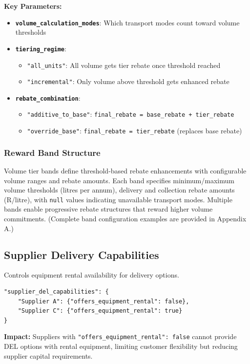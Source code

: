 \textbf{Key Parameters:}
\begin{itemize}
    \item \textbf{\texttt{volume\_calculation\_modes}}: Which transport modes count toward volume thresholds
    \item \textbf{\texttt{tiering\_regime}}: 
    \begin{itemize}
        \item \texttt{"all\_units"}: All volume gets tier rebate once threshold reached
        \item \texttt{"incremental"}: Only volume above threshold gets enhanced rebate
    \end{itemize}
    \item \textbf{\texttt{rebate\_combination}}: 
    \begin{itemize}
        \item \texttt{"additive\_to\_base"}: \texttt{final\_rebate = base\_rebate + tier\_rebate}
        \item \texttt{"override\_base"}: \texttt{final\_rebate = tier\_rebate} (replaces base rebate)
    \end{itemize}
\end{itemize}

\subsubsection{Reward Band Structure}
Volume tier bands define threshold-based rebate enhancements with configurable volume ranges and rebate amounts. Each band specifies minimum/maximum volume thresholds (litres per annum), delivery and collection rebate amounts (R/litre), with \texttt{null} values indicating unavailable transport modes. Multiple bands enable progressive rebate structures that reward higher volume commitments. (Complete band configuration examples are provided in Appendix A.)

\subsection{Supplier Delivery Capabilities}
Controls equipment rental availability for delivery options.

\begin{verbatim}
"supplier_del_capabilities": {
    "Supplier A": {"offers_equipment_rental": false},
    "Supplier C": {"offers_equipment_rental": true}
}
\end{verbatim}

\textbf{Impact:} Suppliers with \texttt{"offers\_equipment\_rental": false} cannot provide DEL options with rental equipment, limiting customer flexibility but reducing supplier capital requirements.


